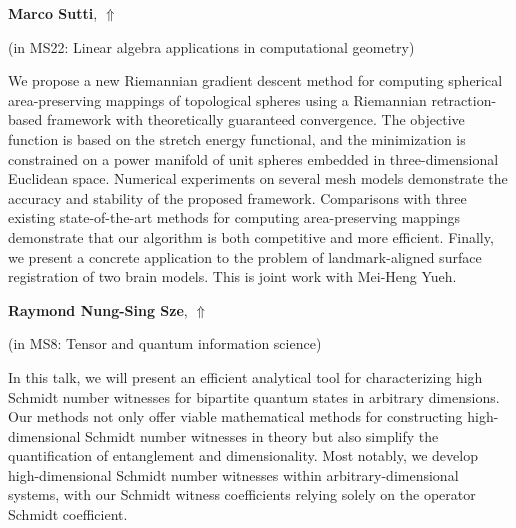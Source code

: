 \documentclass[ILAS2025-program.tex]{subfiles}
\begin{document}
\hypertarget{down0036}{}\begin{ilasabstract}
    
\textbf{Marco Sutti},  \hfill \hyperlink{up0036}{$\Uparrow$}
    
    
(in {\color{mstitle}MS22: Linear algebra applications in computational geometry})
        
\mtskip
    We propose a new Riemannian gradient descent method for computing spherical area-preserving mappings of topological spheres using a Riemannian retraction-based framework with theoretically guaranteed convergence.
The objective function is based on the stretch energy functional, and the minimization is constrained on a power manifold of unit spheres embedded in three-dimensional Euclidean space.
Numerical experiments on several mesh models demonstrate the accuracy and stability of the proposed framework. Comparisons with three existing state-of-the-art methods for computing area-preserving mappings demonstrate that our algorithm is both competitive and more efficient. Finally, we present a concrete application to the problem of landmark-aligned surface registration of two brain models. This is joint work with Mei-Heng Yueh.

\end{ilasabstract}
    

\hypertarget{down0250}{}\begin{ilasabstract}
    
\textbf{Raymond Nung-Sing Sze},  \hfill \hyperlink{up0250}{$\Uparrow$}
    
    
(in {\color{mstitle}MS8: Tensor and quantum information science})
        
\mtskip
    In this talk, we will present an efficient analytical tool for characterizing high Schmidt number witnesses for bipartite quantum states in arbitrary dimensions.
Our methods not only offer viable mathematical methods for constructing high-dimensional Schmidt number witnesses in theory but also simplify the quantification of entanglement and dimensionality.
Most notably, we develop high-dimensional Schmidt number witnesses within arbitrary-dimensional systems, with our Schmidt witness coefficients relying solely on the operator Schmidt coefficient. 

\end{ilasabstract}
    
\end{document}
